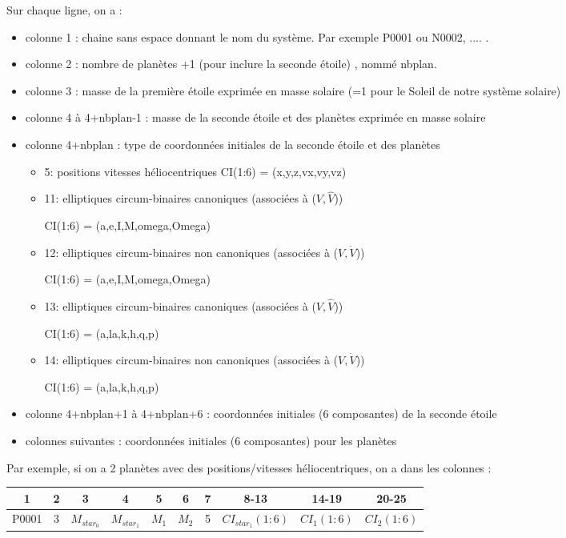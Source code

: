 \documentclass[11pt]{article}
\begin{document}
Sur chaque ligne, on a :
\begin{itemize}
\item colonne 1 : chaine sans espace donnant le nom du syst\`eme. Par exemple P0001 ou N0002, .... .
\item colonne 2 : nombre de plan\`etes +1 (pour inclure la seconde \'etoile) , nomm\'e nbplan.
\item colonne 3 : masse de la premi\`ere \'etoile exprimée en masse solaire (=1 pour le Soleil de notre système solaire)
\item colonne 4 \`a 4+nbplan-1 : masse de la seconde \'etoile et des plan\`etes  exprimée en masse solaire
\item colonne 4+nbplan : type de coordonn\'ees initiales de la seconde \'etoile et des plan\`etes
\begin{itemize}
\item 5:  positions vitesses h\'eliocentriques
	     CI(1:6) = (x,y,z,vx,vy,vz)
\item 11:  elliptiques circum-binaires canoniques (associ\'ees \`a ($V,\hat{V}$))

	     CI(1:6) = (a,e,I,M,omega,Omega)
\item 12:  elliptiques circum-binaires non canoniques (associ\'ees \`a ($V,\dot{V}$))

	     CI(1:6) = (a,e,I,M,omega,Omega)
\item 13:  elliptiques circum-binaires canoniques (associ\'ees \`a ($V,\hat{V}$))

	     CI(1:6) = (a,la,k,h,q,p)
\item 14:  elliptiques circum-binaires non canoniques (associ\'ees \`a ($V,\dot{V}$))

	     CI(1:6) = (a,la,k,h,q,p)
\end{itemize}

\item colonne 4+nbplan+1 \`a  4+nbplan+6 :   coordonn\'ees initiales (6 composantes) de la seconde \'etoile
\item  colonnes suivantes :   coordonn\'ees initiales (6 composantes) pour les plan\`etes 
\end{itemize}

 Par exemple, si on a 2 plan\`etes avec des positions/vitesses h\'eliocentriques, on a dans les colonnes :
 
\begin{tabular}{|c|c|c|c|c|c|c|c|c|c|} \hline
1 &  2 &  3 & 4 & 5 &6 &7 &8-13 &14-19 &20-25 \\ \hline
P0001 & 3 & $M_{star_0}$  & $M_{star_1}$ &  $M_1$ & $M_2$  &5 &$CI_{star_1}(1:6)$ & $CI_1(1:6)$&$CI_2(1:6)$\\    \hline
\end{tabular}
\end{document}
